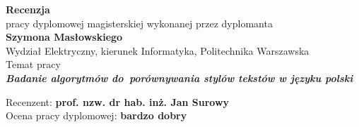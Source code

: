 \newpage
\begin{center}
 {\large\bf  Recenzja } \\
pracy dyplomowej magisterskiej wykonanej przez dyplomanta\\
{\bf Szymona Masłowskiego} \\
 Wydział Elektryczny, kierunek Informatyka,  Politechnika Warszawska\\
Temat pracy\\
\textit{\bf
Badanie algorytmów \linebreak[1]do~porównywania stylów tekstów w języku polski
}\\
\end{center}
\medskip
\noindent
Recenzent: {\bf prof. nzw. dr hab. inż. Jan Surowy}\\
Ocena pracy dyplomowej: {\bf bardzo dobry}
\medskip


